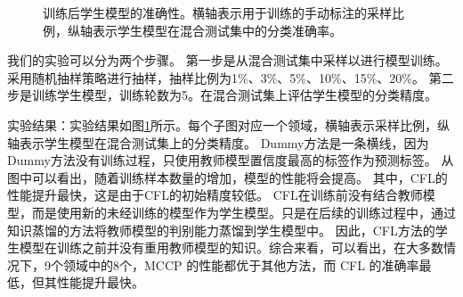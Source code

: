 \documentclass[fontset=macnew,UTF8]{article} %
\begin{document}
\begin{figure}[h!]
{\begin{minipage}[b]{.3\linewidth}
		\end{minipage}
	}
	\caption{训练后学生模型的准确性。横轴表示用于训练的手动标注的采样比例，纵轴表示学生模型在混合测试集中的分类准确率。}
	\label{major_results}
\end{figure}

我们的实验可以分为两个步骤。 第一步是从混合测试集中采样以进行模型训练。采用随机抽样策略进行抽样，抽样比例为1\%、3\%、5\%、10\%、15\%、20\%\cite{shen2020multiple}。 第二步是训练学生模型，训练轮数为5。在混合测试集上评估学生模型的分类精度。

实验结果：实验结果如图\ref{major_results}所示。每个子图对应一个领域，横轴表示采样比例，纵轴表示学生模型在混合测试集上的分类精度。 Dummy方法是一条横线，因为Dummy方法没有训练过程，只使用教师模型置信度最高的标签作为预测标签。 从图中可以看出，随着训练样本数量的增加，模型的性能将会提高。 其中，CFL的性能提升最快，这是由于CFL的初始精度较低。 CFL在训练前没有结合教师模型，而是使用新的未经训练的模型作为学生模型。只是在后续的训练过程中，通过知识蒸馏的方法将教师模型的判别能力蒸馏到学生模型中。 因此，CFL方法的学生模型在训练之前并没有重用教师模型的知识。综合来看，可以看出，在大多数情况下，9个领域中的8个，MCCP 的性能都优于其他方法，而 CFL 的准确率最低，但其性能提升最快。
\end{document}
